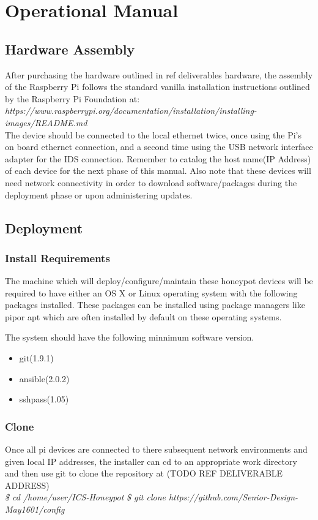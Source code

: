 \chapter{Operational Manual}

\section{Hardware Assembly}

After purchasing the hardware outlined in {ref deliverables hardware}, the assembly of the Raspberry Pi follows the standard vanilla installation instructions outlined by the Raspberry Pi Foundation at:
\\\newline
\textit{https://www.raspberrypi.org/documentation/installation/installing-images/README.md}
\\\newline
The device should be connected to the local ethernet twice, once using the Pi's on board ethernet connection, and a second time using the USB network interface adapter for the IDS connection. Remember to catalog the host name(IP Address) of each device for the next phase of this manual. Also note that these devices will need network connectivity in order to download software/packages during the deployment phase or upon administering updates.

\section{Deployment}
\subsection{Install Requirements}
The machine which will deploy/configure/maintain these honeypot devices will be required to have either an OS X or Linux operating system with the following packages installed. These packages can be installed using package managers like pipor apt which are often installed by default on these operating systems. 

The system should have the following minnimum software version.
\begin{itemize}
\item git(1.9.1)
\item ansible(2.0.2)
\item sshpass(1.05)
\end{itemize}

\subsection{Clone}
Once all pi devices are connected to there subsequent network environments and given local IP addresses, the installer can cd to an appropriate work directory and then use git to clone the repository at (TODO REF DELIVERABLE ADDRESS) 
\\\newline
\textit{\$ cd /home/user/ICS-Honeypot}
\newline
\textit{\$ git clone https://github.com/Senior-Design-May1601/config}
\\\newline

